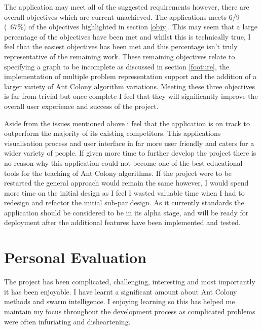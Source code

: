 The application may meet all of the suggested requirements however, there are overall objectives which are current unachieved. The applications meets 6/9 (~67\%) of the objectives highlighted in section \ref{objy}. This may seem that a large percentage of the objectives have been met and whilst this is technically true, I feel that the easiest objectives has been met and this percentage isn’t truly representative of the remaining work. These remaining objectives relate to specifying a graph to be incomplete as discussed in section \ref{footure}, the implementation of multiple problem representation support and the addition of a larger variety of Ant Colony algorithm variations. Meeting these three objectives is far from trivial but once complete I feel that they will significantly improve the overall user experience and success of the project. 

Aside from the issues mentioned above i feel that the application is on track to outperform the majority of its existing competitors. This applications visualisation process and user interface in far more user friendly and caters for a wider variety of people. If given more time to further develop the project there is no reason why this application could not become one of the best educational tools for the teaching of Ant Colony algorithms. If the project were to be restarted the general approach would remain the same however, I would spend more time on the initial design as I feel I wasted valuable time when I had to redesign and refactor the initial sub-par design. As it currently standards the application should be considered to be in its alpha stage, and will be ready for deployment after the additional features have been implemented and tested.

\section{Personal Evaluation}

The project has been complicated, challenging, interesting and most importantly it has been enjoyable. I have learnt a significant amount about Ant Colony methods and swarm intelligence. I enjoying learning so this has helped me maintain my focus throughout the development process as complicated problems were often infuriating and disheartening.

